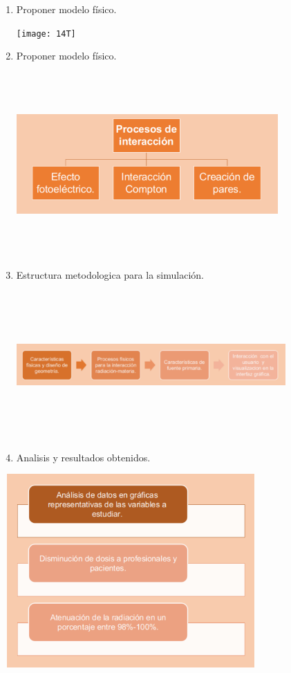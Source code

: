 \documentclass{beamer}
\begin{document}
\begin{enumerate}
\begin{center}
\end{center}
\newpage
 \item Proponer modelo físico.
\begin{center}
\texttt{[image: 14T]}
\end{center}
\newpage
 \item Proponer modelo físico.
\begin{center}
\includegraphics[width=10cm,height=7cm]{15T}
\end{center}



 \newpage
 \item Estructura metodologica para la simulación.
\begin{center}
\includegraphics[width=10.3cm,height=5.6cm]{8T}
\end{center}

\newpage
 \item Analisis y resultados obtenidos.
 \end{enumerate} 
 
\begin{center}
\includegraphics[width=10cm,height=7.4cm]{9T}
\end{center}
 
\end{document}
